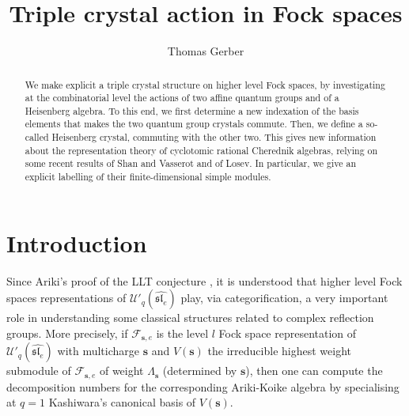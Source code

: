 \documentclass[twoside,12pt]{amsart}
\theoremstyle{plain}
\newcommand{\cF}{\mathcal{F}}
\newcommand{\bs}{\mathbf{s}}
\newcommand{\La}{\Lambda}
\newcommand{\Ue}{\mathcal{U}'_q (\widehat{\mathfrak{sl}_e})}
\theoremstyle{remark}
\begin{document}
\title{Triple crystal action in Fock spaces}
\author{Thomas Gerber}



\address{Lehrstuhl D f\"ur Mathematik, RWTH Aachen University,
52062 Aachen, Germany}



\begin{abstract}
We make explicit a triple crystal structure on higher level Fock spaces,
by investigating at the combinatorial level the actions of two affine quantum groups and of a Heisenberg algebra.
To this end, we first determine a new indexation of the basis elements that makes the two quantum group crystals commute.
Then, we define a so-called Heisenberg crystal, commuting with the other two.
This gives new information about the representation theory of 
cyclotomic rational Cherednik algebras, relying on some recent results of Shan and Vasserot and of Losev.
In particular, we give an explicit labelling of their finite-dimensional simple modules.
\end{abstract}

\maketitle


\tableofcontents


\section{Introduction}

Since Ariki's proof \cite{Ariki1996} of the LLT conjecture \cite{LLT1996},
it is understood that higher level Fock spaces representations of $\Ue$
play, via categorification, a very important role in understanding
some classical structures related to complex reflection groups.
More precisely, if $\cF_{\bs,e}$ is the level $l$ Fock space representation of $\Ue$ with multicharge $\bs$
and $V(\bs)$ the irreducible highest weight submodule of $\cF_{\bs,e}$ of weight $\La_{\bs}$
(determined by $\bs$),
then one can compute the decomposition numbers for the corresponding Ariki-Koike algebra
by specialising at $q=1$ Kashiwara's canonical basis of $V(\bs)$.
\end{document}
